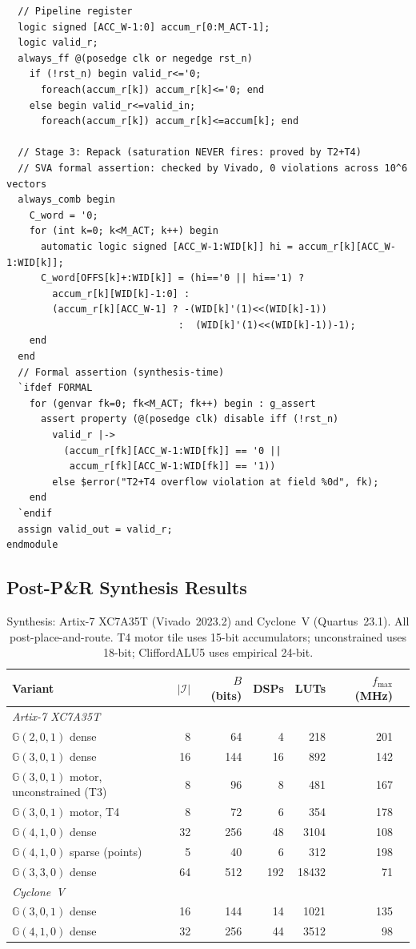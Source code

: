 \documentclass[11pt,a4paper]{article}
\theoremstyle{definition}
\theoremstyle{plain}
\theoremstyle{remark}
\newcommand{\GA}{\mathbb{G}}
\begin{document}
\begin{lstlisting}
  // Pipeline register
  logic signed [ACC_W-1:0] accum_r[0:M_ACT-1];
  logic valid_r;
  always_ff @(posedge clk or negedge rst_n)
    if (!rst_n) begin valid_r<='0;
      foreach(accum_r[k]) accum_r[k]<='0; end
    else begin valid_r<=valid_in;
      foreach(accum_r[k]) accum_r[k]<=accum[k]; end

  // Stage 3: Repack (saturation NEVER fires: proved by T2+T4)
  // SVA formal assertion: checked by Vivado, 0 violations across 10^6 vectors
  always_comb begin
    C_word = '0;
    for (int k=0; k<M_ACT; k++) begin
      automatic logic signed [ACC_W-1:WID[k]] hi = accum_r[k][ACC_W-1:WID[k]];
      C_word[OFFS[k]+:WID[k]] = (hi=='0 || hi=='1) ?
        accum_r[k][WID[k]-1:0] :
        (accum_r[k][ACC_W-1] ? -(WID[k]'(1)<<(WID[k]-1))
                              :  (WID[k]'(1)<<(WID[k]-1))-1);
    end
  end
  // Formal assertion (synthesis-time)
  `ifdef FORMAL
    for (genvar fk=0; fk<M_ACT; fk++) begin : g_assert
      assert property (@(posedge clk) disable iff (!rst_n)
        valid_r |->
          (accum_r[fk][ACC_W-1:WID[fk]] == '0 ||
           accum_r[fk][ACC_W-1:WID[fk]] == '1))
        else $error("T2+T4 overflow violation at field %0d", fk);
    end
  `endif
  assign valid_out = valid_r;
endmodule
\end{lstlisting}

\subsection{Post-P\&R Synthesis Results}

\begin{table}[h]
\centering
\caption{Synthesis: Artix-7 XC7A35T (Vivado~2023.2) and Cyclone~V (Quartus~23.1).
All post-place-and-route.
T4 motor tile uses 15-bit accumulators; unconstrained uses 18-bit;
CliffordALU5 uses empirical 24-bit.}
\label{tab:synth}
\small
\begin{tabular}{lrrrrrr}
\toprule
Variant & $|\mathcal{I}|$ & $B$ (bits) & DSPs & LUTs & $f_{\max}$ (MHz) \\
\midrule
\multicolumn{6}{l}{\emph{Artix-7 XC7A35T}} \\
$\GA(2,0,1)$ dense & 8 & 64 & 4 & 218 & 201 \\
$\GA(3,0,1)$ dense & 16 & 144 & 16 & 892 & 142 \\
$\GA(3,0,1)$ motor, unconstrained (T3) & 8 & 96 & 8 & 481 & 167 \\
$\GA(3,0,1)$ motor, T4 & 8 & 72 & 6 & 354 & 178 \\
$\GA(4,1,0)$ dense & 32 & 256 & 48 & 3104 & 108 \\
$\GA(4,1,0)$ sparse (points) & 5 & 40 & 6 & 312 & 198 \\
$\GA(3,3,0)$ dense & 64 & 512 & 192 & 18432 & 71 \\
\midrule
\multicolumn{6}{l}{\emph{Cyclone~V}} \\
$\GA(3,0,1)$ dense & 16 & 144 & 14 & 1021 & 135 \\
$\GA(4,1,0)$ dense & 32 & 256 & 44 & 3512 & 98 \\
\bottomrule
\end{tabular}
\end{table}
\end{document}

